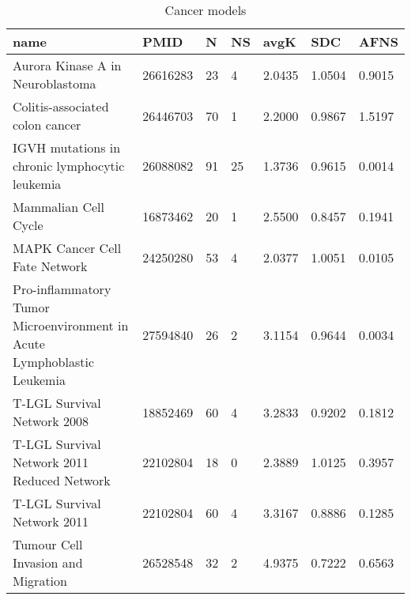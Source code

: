 \begin{table}
\centering
\caption{Cancer models}
\label{tab:Cancer}
\begin{tabular}{|p{180pt}||p{40pt}|p{25pt}|p{25pt}|p{40pt}|p{25pt}|p{25pt}|}
\toprule
name & PMID &N &NS & avgK &SDC & AFNS \\
\midrule
Aurora Kinase A in Neuroblastoma & 26616283 & 23 & 4 & 2.0435 & 1.0504 & 0.9015 \\
Colitis-associated colon cancer & 26446703 & 70 & 1 & 2.2000 & 0.9867 & 1.5197 \\
IGVH mutations in chronic lymphocytic leukemia & 26088082 & 91 &25 & 1.3736 & 0.9615 & 0.0014 \\
Mammalian Cell Cycle & 16873462 & 20 & 1 & 2.5500 & 0.8457 & 0.1941 \\
MAPK Cancer Cell Fate Network & 24250280 & 53 & 4 & 2.0377 & 1.0051 & 0.0105 \\
Pro-inflammatory Tumor Microenvironment in Acute Lymphoblastic Leukemia & 27594840 & 26 & 2 & 3.1154 & 0.9644 & 0.0034 \\
T-LGL Survival Network 2008 & 18852469 & 60 & 4 & 3.2833 & 0.9202 & 0.1812 \\
T-LGL Survival Network 2011 Reduced Network & 22102804 & 18 & 0 & 2.3889 & 1.0125 & 0.3957 \\
T-LGL Survival Network 2011 & 22102804 & 60 & 4 & 3.3167 & 0.8886 & 0.1285 \\
Tumour Cell Invasion and Migration & 26528548 & 32 & 2 & 4.9375 & 0.7222 & 0.6563 \\
\bottomrule
\end{tabular}
\end{table}
